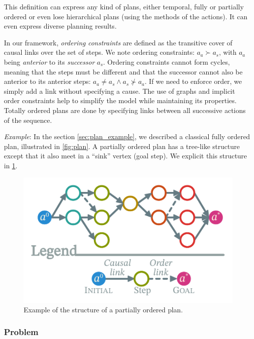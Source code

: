 \documentclass[11pt,a4paper,twoside,openright,titlepage,numbers=noenddot,headinclude,cleardoublepage=empty,openany]{scrreprt}
\theoremstyle{plain}
\theoremstyle{definition}
\theoremstyle{remark}
\begin{document}
This definition can express any kind of plans, either temporal, fully or
partially ordered or even lose hierarchical plans (using the methods of
the actions). It can even express diverse planning results.

In our framework, \emph{ordering constraints} are defined as the
transitive cover of causal links over the set of steps. We note ordering
constraints: \(a_a \succ a_s\), with \(a_a\) being \emph{anterior} to
its \emph{successor} \(a_s\). Ordering constraints cannot form cycles,
meaning that the steps must be different and that the successor cannot
also be anterior to its anterior steps:
\(a_a \neq a_s \land a_s \not \succ a_a\). If we need to enforce order,
we simply add a link without specifying a cause. The use of graphs and
implicit order constraints help to simplify the model while maintaining
its properties. Totally ordered plans are done by specifying links
between all successive actions of the sequence.

\emph{Example}: In the section \ref{sec:plan_example}, we described a
classical fully ordered plan, illustrated in \cref{fig:plan}. A
partially ordered plan has a tree-like structure except that it also
meet in a ``sink'' vertex (goal step). We explicit this structure in
\cref{fig:poplan}.

\begin{figure}
\hypertarget{fig:poplan}{%
\centering
\includegraphics{./tex2pdf.-0b80fea6fd6da7f9/bd83255fa28f7e1ab4a8fb965f489ac2fe52901c.pdf}
\caption{Example of the structure of a partially ordered
plan.}\label{fig:poplan}
}
\end{figure}

\hypertarget{problem}{%
\subsubsection{Problem}\label{problem}}
\end{document}
